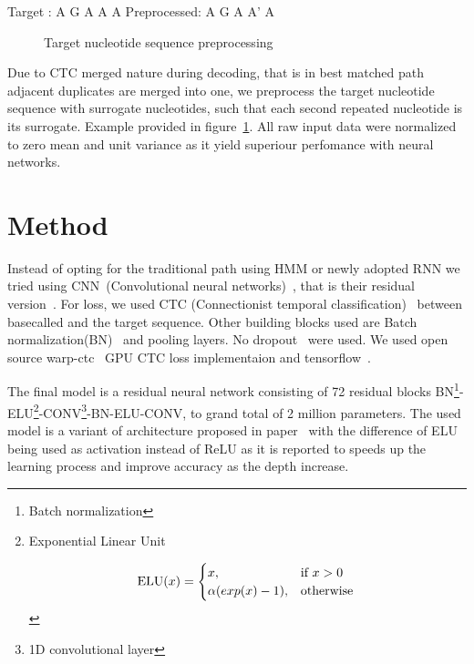 \documentclass[runningheads,a4paper]{llncs}
\begin{document}
\begin{verbbox}
    Target      :  A  G  A  A  A
    Preprocessed:  A  G  A  A' A
\end{verbbox}

\begin{figure}[!h]
    \centering
    \theverbbox
    \caption{Target nucleotide sequence preprocessing}
    \label{fig:data_preprocessing}
\end{figure}

Due to CTC merged nature during decoding, that is in best matched path adjacent duplicates are merged into one, we preprocess the target nucleotide sequence with surrogate nucleotides, such that each second repeated nucleotide is its surrogate. Example provided in figure~\ref{fig:data_preprocessing}. All raw input data were normalized to zero mean and unit variance as it yield superiour perfomance with neural networks.

\section{Method}
Instead of opting for the traditional path using HMM or newly adopted RNN we tried using CNN~(Convolutional neural networks)~\cite{lecun-98}, that is their residual version~\cite{he2016deep}. For loss, we used CTC (Connectionist temporal classification)~\cite{graves2006connectionist} between basecalled and the target sequence. Other building blocks used are Batch normalization(BN)~\cite{BNORM} and pooling layers. No dropout~\cite{srivastava2014dropout} were used. We used open source warp-ctc~\cite{warpctc} GPU CTC loss implementaion and tensorflow~\cite{tensorflow2015-whitepaper}.

The final model is a residual neural network consisting of 72 residual blocks BN\footnote{Batch normalization}-ELU\footnote{Exponential Linear Unit

\begin{equation*}
\text{ELU}(x)=
    \begin{cases}
        x, & \text{if}\ x>0 \\
        \alpha (exp(x) - 1), & \text{otherwise}
        \end{cases}    \\
\end{equation*}

}-CONV\footnote{1D convolutional layer}-BN-ELU-CONV, to grand total of 2 million parameters. The used model is a variant of architecture proposed in paper~\cite{identitet} with the difference of ELU being used as activation instead of ReLU as it is reported \cite{resnet-elu} to speeds up the learning process and improve accuracy as the depth increase.
\end{document}
